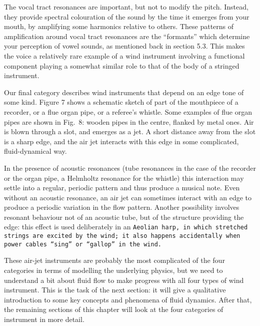   The vocal tract resonances are important, but not to modify the pitch. 
  Instead, they provide spectral colouration of the sound by the time it 
  emerges from your mouth, by amplifying some harmonics relative to others. 
  These patterns of amplification around vocal tract resonances are the 
  “formants” which determine your perception of vowel sounds, as mentioned back 
  in section 5.3. This makes the voice a relatively rare example of a wind 
  instrument involving a functional component playing a somewhat similar role 
  to that of the body of a stringed instrument. 

  Our final category describes wind instruments that depend on an edge tone of 
  some kind. Figure 7 shows a schematic sketch of part of the mouthpiece of a 
  recorder, or a flue organ pipe, or a referee’s whistle. Some examples of flue 
  organ pipes are shown in Fig.\ 8: wooden pipes in the centre, flanked by 
  metal ones. Air is blown through a slot, and emerges as a jet. A short 
  distance away from the slot is a sharp edge, and the air jet interacts with 
  this edge in some complicated, fluid-dynamical way. 



  In the presence of acoustic resonances (tube resonances in the case of the 
  recorder or the organ pipe, a Helmholtz resonance for the whistle) this 
  interaction may settle into a regular, periodic pattern and thus produce a 
  musical note. Even without an acoustic resonance, an air jet can sometimes 
  interact with an edge to produce a periodic variation in the flow pattern. 
  Another possibility involves resonant behaviour not of an acoustic tube, but 
  of the structure providing the edge: this effect is used deliberately in an 
  \tt{}Aeolian harp\rm{}, in which stretched strings are excited by the wind; 
  it also happens accidentally when power cables “sing” or “gallop” in the 
  wind. 

  These air-jet instruments are probably the most complicated of the four 
  categories in terms of modelling the underlying physics, but we need to 
  understand a bit about fluid flow to make progress with all four types of 
  wind instrument. This is the task of the next section: it will give a 
  qualitative introduction to some key concepts and phenomena of fluid 
  dynamics. After that, the remaining sections of this chapter will look at the 
  four categories of instrument in more detail. 

